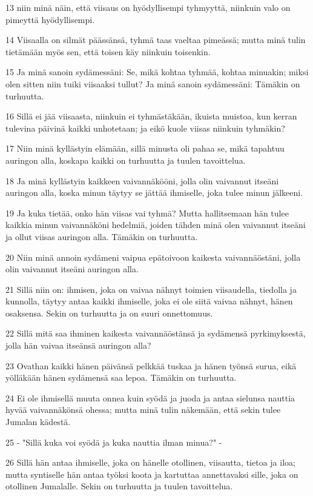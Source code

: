 \par 13 niin minä näin, että viisaus on hyödyllisempi tyhmyyttä, niinkuin valo on pimeyttä hyödyllisempi.
\par 14 Viisaalla on silmät päässänsä, tyhmä taas vaeltaa pimeässä; mutta minä tulin tietämään myös sen, että toisen käy niinkuin toisenkin.
\par 15 Ja minä sanoin sydämessäni: Se, mikä kohtaa tyhmää, kohtaa minuakin; miksi olen sitten niin tuiki viisaaksi tullut? Ja minä sanoin sydämessäni: Tämäkin on turhuutta.
\par 16 Sillä ei jää viisaasta, niinkuin ei tyhmästäkään, ikuista muistoa, kun kerran tulevina päivinä kaikki unhotetaan; ja eikö kuole viisas niinkuin tyhmäkin?
\par 17 Niin minä kyllästyin elämään, sillä minusta oli pahaa se, mikä tapahtuu auringon alla, koskapa kaikki on turhuutta ja tuulen tavoittelua.
\par 18 Ja minä kyllästyin kaikkeen vaivannäkööni, jolla olin vaivannut itseäni auringon alla, koska minun täytyy se jättää ihmiselle, joka tulee minun jälkeeni.
\par 19 Ja kuka tietää, onko hän viisas vai tyhmä? Mutta hallitsemaan hän tulee kaikkia minun vaivannäköni hedelmiä, joiden tähden minä olen vaivannut itseäni ja ollut viisas auringon alla. Tämäkin on turhuutta.
\par 20 Niin minä annoin sydämeni vaipua epätoivoon kaikesta vaivannäöstäni, jolla olin vaivannut itseäni auringon alla.
\par 21 Sillä niin on: ihmisen, joka on vaivaa nähnyt toimien viisaudella, tiedolla ja kunnolla, täytyy antaa kaikki ihmiselle, joka ei ole siitä vaivaa nähnyt, hänen osaksensa. Sekin on turhuutta ja on suuri onnettomuus.
\par 22 Sillä mitä saa ihminen kaikesta vaivannäöstänsä ja sydämensä pyrkimyksestä, jolla hän vaivaa itseänsä auringon alla?
\par 23 Ovathan kaikki hänen päivänsä pelkkää tuskaa ja hänen työnsä surua, eikä yölläkään hänen sydämensä saa lepoa. Tämäkin on turhuutta.
\par 24 Ei ole ihmisellä muuta onnea kuin syödä ja juoda ja antaa sielunsa nauttia hyvää vaivannäkönsä ohessa; mutta minä tulin näkemään, että sekin tulee Jumalan kädestä.
\par 25 - "Sillä kuka voi syödä ja kuka nauttia ilman minua?" -
\par 26 Sillä hän antaa ihmiselle, joka on hänelle otollinen, viisautta, tietoa ja iloa; mutta syntiselle hän antaa työksi koota ja kartuttaa annettavaksi sille, joka on otollinen Jumalalle. Sekin on turhuutta ja tuulen tavoittelua.

